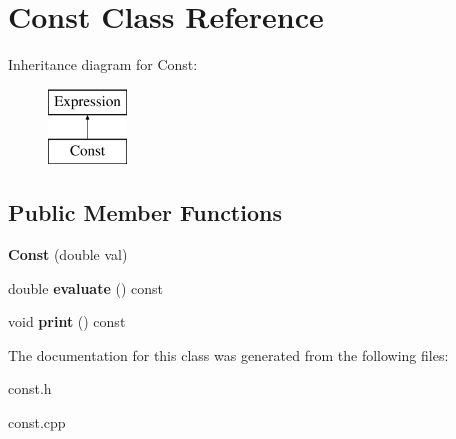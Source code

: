 \hypertarget{class_const}{}\section{Const Class Reference}
\label{class_const}
Inheritance diagram for Const\+:\begin{figure}[H]
\begin{center}
\leavevmode
\includegraphics[height=2.000000cm]{class_const}
\end{center}
\end{figure}
\subsection*{Public Member Functions}
\begin{DoxyCompactItemize}
\item 
\mbox{\label{class_const_a685dd0971c313a7ccb4a8fd6f3912615}} 
{\bfseries Const} (double val)
\item 
\mbox{\label{class_const_a2f86d9af4cbc9dda466815c66360ba16}} 
double {\bfseries evaluate} () const
\item 
\mbox{\label{class_const_a81dc57c45d716e31d1cdb65a2c8f227d}} 
void {\bfseries print} () const
\end{DoxyCompactItemize}


The documentation for this class was generated from the following files\+:\begin{DoxyCompactItemize}
\item 
const.\+h\item 
const.\+cpp\end{DoxyCompactItemize}
